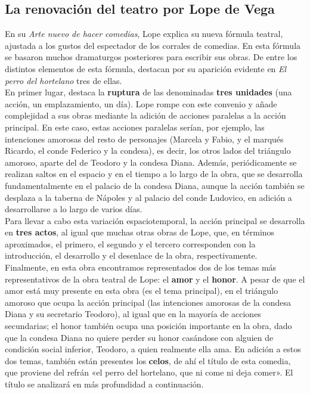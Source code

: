 \documentclass[12pt,a4paper]{article}
\begin{document}
\subsection{La renovación del teatro por Lope de Vega}

En su \textit{Arte nuevo de hacer comedias}, Lope explica su nueva fórmula teatral, ajustada a los gustos del espectador de los corrales de comedias. En esta fórmula se basaron muchos dramaturgos posteriores para escribir sus obras. De entre los distintos elementos de esta fórmula, destacan por su aparición evidente en \textit{El perro del hortelano} tres de ellas.\\

En primer lugar, destaca la \textbf{ruptura} de las denominadas \textbf{tres unidades} (una acción, un emplazamiento, un día). Lope rompe con este convenio y añade complejidad a sus obras mediante la adición de acciones paralelas a la acción principal. En este caso, estas acciones paralelas serían, por ejemplo, las intenciones amorosas del resto de personajes (Marcela y Fabio, y el marqués Ricardo, el conde Federico y la condesa), es decir, los otros lados del triángulo amoroso, aparte del de Teodoro y la condesa Diana. Además, periódicamente se realizan saltos en el espacio y en el tiempo a lo largo de la obra, que se desarrolla fundamentalmente en el palacio de la condesa Diana, aunque la acción también se desplaza a la taberna de Nápoles y al palacio del conde Ludovico, en adición a desarrollarse a lo largo de varios días.\\

Para llevar a cabo esta variación espaciotemporal, la acción principal se desarrolla en \textbf{tres actos}, al igual que muchas otras obras de Lope, que, en términos aproximados, el primero, el segundo y el tercero corresponden con la introducción, el desarrollo y el desenlace de la obra, respectivamente.\\

Finalmente, en esta obra encontramos representados dos de los temas más representativos de la obra teatral de Lope: el \textbf{amor} y el \textbf{honor}. A pesar de que el amor está muy presente en esta obra (es el tema principal), en el triángulo amoroso que ocupa la acción principal (las intenciones amorosas de la condesa Diana y su secretario Teodoro), al igual que en la mayoría de acciones secundarias; el honor también ocupa una posición importante en la obra, dado que la condesa Diana no quiere perder su honor casándose con alguien de condición social inferior, Teodoro, a quien realmente ella ama. En adición a estos dos temas, también están presentes los \textbf{celos}, de ahí el título de esta comedia, que proviene del refrán «el perro del hortelano, que ni come ni deja comer». El título se analizará en más profundidad a continuación.
\end{document}
